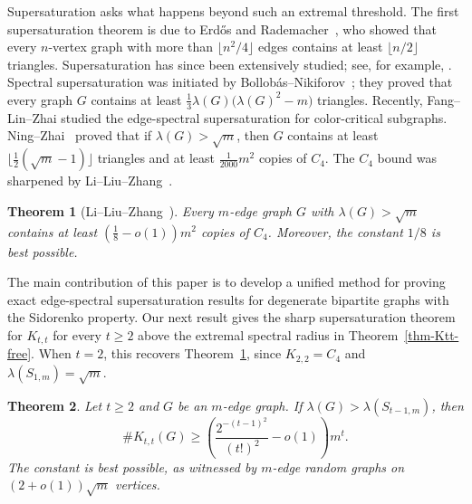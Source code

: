 \documentclass[10pt,a4paper]{amsart}
\newtheorem{theorem}{Theorem}[section]
\newcommand{\Ktt}{K_{t,t}}
\begin{document}
Supersaturation asks what happens beyond such an extremal threshold.  The
first supersaturation theorem is due to Erd\H{o}s and
Rademacher~\cite{Erd1962a,Erdos1964}, who showed that every
\(n\)-vertex graph with more than \(\lfloor n^2/4\rfloor\) edges contains
at least \(\lfloor n/2\rfloor\) triangles.  Supersaturation has since
been extensively studied; see, for example,
\cite{LiuPikhurkoStaden2020,Reiher2016,Mubayi2010CountingSubstructuresI,
PikhurkoYilma2017Supersaturation,MY2025}.  Spectral supersaturation was
initiated by Bollob\'as--Nikiforov~\cite{BN2007jctb}; they proved that
every graph \(G\) contains at least
        $\frac13\lambda(G)\bigl(\lambda(G)^2-m\bigr)$
triangles. Recently, 
Fang--Lin--Zhai \cite{FangLinZhai2026} studied 
the edge-spectral supersaturation for color-critical subgraphs.  
Ning--Zhai~\cite{NZ2021,NZ2021b} proved that if
\(\lambda(G)>\sqrt m\), then \(G\) contains at least
\(\lfloor \frac{1}{2}(\sqrt m-1)\rfloor\) triangles and at least
\(\frac1{2000}m^2\) copies of \(C_4\).  The \(C_4\) bound was sharpened
by Li--Liu--Zhang~\cite{LiLiuZhang2025NosalBooksC4}.

\begin{theorem}[Li--Liu--Zhang~\cite{LiLiuZhang2025NosalBooksC4}]
\label{thm:counting-C4}
Every \(m\)-edge graph \(G\) with \(\lambda(G)>\sqrt m\) contains at
least        $\left(\frac18-o(1)\right)m^2$
copies of \(C_4\).  Moreover, the constant \(1/8\) is best possible.
\end{theorem}

The main contribution of this paper 
is to develop a unified method for proving
exact edge-spectral supersaturation results for degenerate bipartite graphs with the Sidorenko property.   
Our next result gives the sharp supersaturation theorem for \(K_{t,t}\) for every $t\ge 2$  
above the extremal spectral radius in Theorem~\ref{thm-Ktt-free}.  When
\(t=2\), this recovers Theorem~\ref{thm:counting-C4}, since
\(K_{2,2}=C_4\) and \(\lambda(S_{1,m})=\sqrt m\).

\begin{theorem}\label{thm:sharp-Ktt}
Let $t\ge 2$ and $G$ be an $m$-edge graph. If $\lambda(G)> \lambda(S_{t-1,m})$, then
\[
   \texttt{\#}\Ktt(G) \ge
   \left( \frac{2^{-(t-1)^2}}{(t!)^2} -o(1)\right)m^t .
\]
The constant is best possible, as witnessed by $m$-edge random graphs on
$(2+o(1))\sqrt m$ vertices.
\end{theorem}
\end{document}
